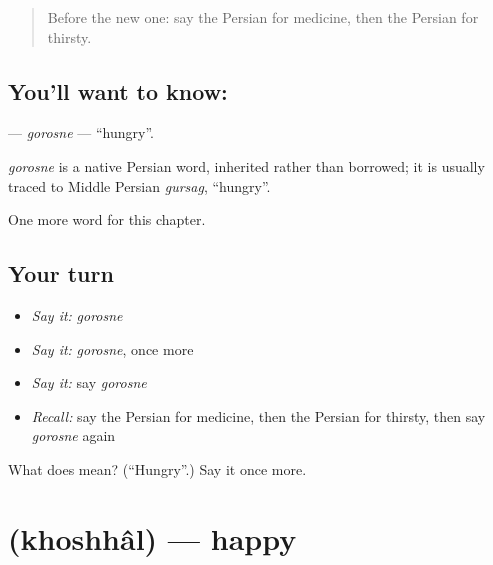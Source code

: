 \label{lesson:FA-C31-gorosne}



\begin{quote}
Before the new one: say the Persian for medicine, then the Persian for thirsty.
\end{quote}

\subsection*{You'll want to know: }
\textbf{} — \emph{gorosne} — \textquotedblleft{}hungry\textquotedblright{}.

\begin{cousinweb}
\emph{gorosne} is a native Persian word, inherited rather than borrowed; it is usually traced to Middle Persian \emph{gursag}, \textquotedblleft{}hungry\textquotedblright{}.
\end{cousinweb}

\begin{grammarlens}[title={What you've built}]
One more word for this chapter.
\end{grammarlens}

\subsection*{Your turn}
\begin{itemize}
\raggedright
  \item \emph{Say it:} \emph{gorosne}
  \item \emph{Say it:} \emph{gorosne}, once more
  \item \emph{Say it:} say \emph{gorosne}
  \item \emph{Recall:} say the Persian for medicine, then the Persian for thirsty, then say \emph{gorosne} again
\end{itemize}

\begin{tcolorbox}[breakable,colback=teal!4,colframe=teal!35!black,title={Before you move on}]
What does  mean? (\textquotedblleft{}Hungry\textquotedblright{}.) Say it once more.
\end{tcolorbox}
\section[\texorpdfstring{\fa{خوشحال} (khoshhâl)}{خوشحال (khoshhâl)}]{ (khoshhâl) — happy}

\label{lesson:FA-C31-khoshhal}




